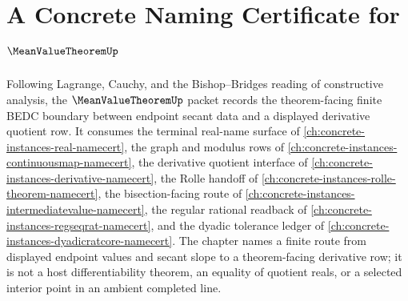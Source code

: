\chapter{A Concrete Naming Certificate for $\MeanValueTheoremUp$}
\label{ch:concrete-instances-mean-value-theorem-namecert}

Following Lagrange, Cauchy, and the Bishop--Bridges reading of constructive analysis, the $\MeanValueTheoremUp$ packet records the theorem-facing finite BEDC boundary between endpoint secant data and a displayed derivative quotient row. It consumes the terminal real-name surface of \autoref{ch:concrete-instances-real-namecert}, the graph and modulus rows of \autoref{ch:concrete-instances-continuousmap-namecert}, the derivative quotient interface of \autoref{ch:concrete-instances-derivative-namecert}, the Rolle handoff of \autoref{ch:concrete-instances-rolle-theorem-namecert}, the bisection-facing route of \autoref{ch:concrete-instances-intermediatevalue-namecert}, the regular rational readback of \autoref{ch:concrete-instances-regseqrat-namecert}, and the dyadic tolerance ledger of \autoref{ch:concrete-instances-dyadicratcore-namecert}. The chapter names a finite route from displayed endpoint values and secant slope to a theorem-facing derivative row; it is not a host differentiability theorem, an equality of quotient reals, or a selected interior point in an ambient completed line.

